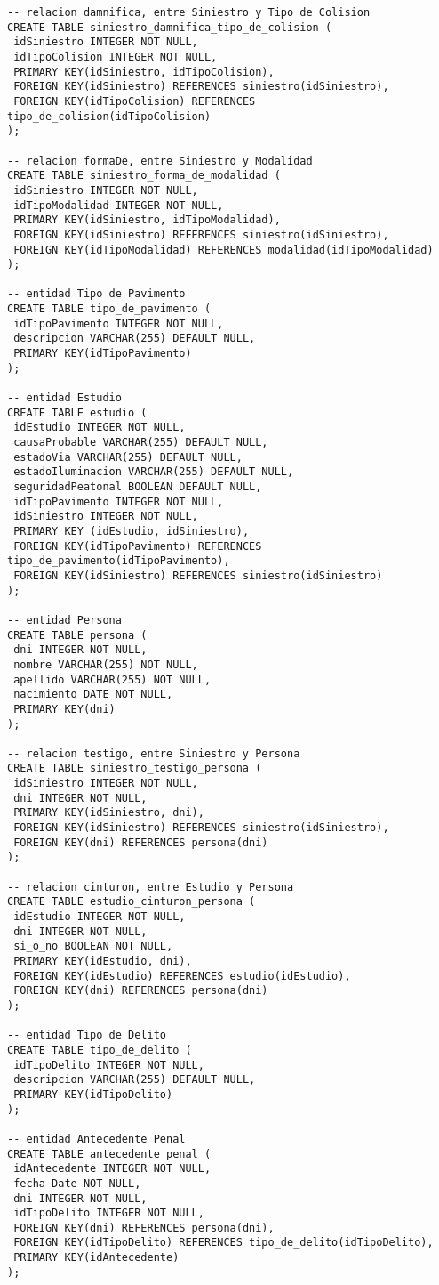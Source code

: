 \begin{verbatim}
-- relacion damnifica, entre Siniestro y Tipo de Colision
CREATE TABLE siniestro_damnifica_tipo_de_colision (
 idSiniestro INTEGER NOT NULL,
 idTipoColision INTEGER NOT NULL,
 PRIMARY KEY(idSiniestro, idTipoColision),
 FOREIGN KEY(idSiniestro) REFERENCES siniestro(idSiniestro),
 FOREIGN KEY(idTipoColision) REFERENCES tipo_de_colision(idTipoColision)
);

-- relacion formaDe, entre Siniestro y Modalidad
CREATE TABLE siniestro_forma_de_modalidad (
 idSiniestro INTEGER NOT NULL,
 idTipoModalidad INTEGER NOT NULL,
 PRIMARY KEY(idSiniestro, idTipoModalidad),
 FOREIGN KEY(idSiniestro) REFERENCES siniestro(idSiniestro),
 FOREIGN KEY(idTipoModalidad) REFERENCES modalidad(idTipoModalidad)
);

-- entidad Tipo de Pavimento
CREATE TABLE tipo_de_pavimento (
 idTipoPavimento INTEGER NOT NULL,
 descripcion VARCHAR(255) DEFAULT NULL,
 PRIMARY KEY(idTipoPavimento)
);

-- entidad Estudio
CREATE TABLE estudio (
 idEstudio INTEGER NOT NULL,
 causaProbable VARCHAR(255) DEFAULT NULL,
 estadoVia VARCHAR(255) DEFAULT NULL,
 estadoIluminacion VARCHAR(255) DEFAULT NULL,
 seguridadPeatonal BOOLEAN DEFAULT NULL,
 idTipoPavimento INTEGER NOT NULL,
 idSiniestro INTEGER NOT NULL,
 PRIMARY KEY (idEstudio, idSiniestro),
 FOREIGN KEY(idTipoPavimento) REFERENCES tipo_de_pavimento(idTipoPavimento),
 FOREIGN KEY(idSiniestro) REFERENCES siniestro(idSiniestro)
);

-- entidad Persona
CREATE TABLE persona (
 dni INTEGER NOT NULL,
 nombre VARCHAR(255) NOT NULL,
 apellido VARCHAR(255) NOT NULL,
 nacimiento DATE NOT NULL,
 PRIMARY KEY(dni)
);

-- relacion testigo, entre Siniestro y Persona
CREATE TABLE siniestro_testigo_persona (
 idSiniestro INTEGER NOT NULL,
 dni INTEGER NOT NULL,
 PRIMARY KEY(idSiniestro, dni),
 FOREIGN KEY(idSiniestro) REFERENCES siniestro(idSiniestro),
 FOREIGN KEY(dni) REFERENCES persona(dni)
);

-- relacion cinturon, entre Estudio y Persona
CREATE TABLE estudio_cinturon_persona (
 idEstudio INTEGER NOT NULL,
 dni INTEGER NOT NULL,
 si_o_no BOOLEAN NOT NULL,
 PRIMARY KEY(idEstudio, dni),
 FOREIGN KEY(idEstudio) REFERENCES estudio(idEstudio),
 FOREIGN KEY(dni) REFERENCES persona(dni)
);

-- entidad Tipo de Delito
CREATE TABLE tipo_de_delito (
 idTipoDelito INTEGER NOT NULL,
 descripcion VARCHAR(255) DEFAULT NULL,
 PRIMARY KEY(idTipoDelito)
);

-- entidad Antecedente Penal
CREATE TABLE antecedente_penal (
 idAntecedente INTEGER NOT NULL,
 fecha Date NOT NULL,
 dni INTEGER NOT NULL,
 idTipoDelito INTEGER NOT NULL,
 FOREIGN KEY(dni) REFERENCES persona(dni),
 FOREIGN KEY(idTipoDelito) REFERENCES tipo_de_delito(idTipoDelito),
 PRIMARY KEY(idAntecedente)
);


\end{verbatim}
